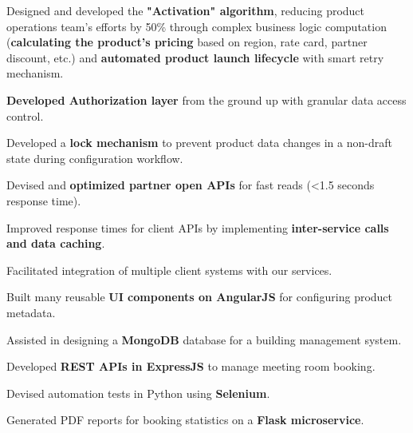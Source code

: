 \documentclass[]{resume-openfont}
\begin{document}
\begin{minipage}[t]{0.66\textwidth}
\begin{tightemize}
\item Designed and developed the \textbf{"Activation" algorithm}, reducing product operations team's efforts by 50\% through complex business logic computation (\textbf{calculating the product’s pricing} based on region, rate card, partner discount, etc.) and \textbf{automated product launch lifecycle} with smart retry mechanism.
\item \textbf{Developed Authorization layer} from the ground up with granular data access control.
\item Developed a \textbf{lock mechanism} to prevent product data changes in a non-draft state during configuration workflow.
\item Devised and \textbf{optimized partner open APIs} for fast reads (<1.5 seconds response time).
\item Improved response times for client APIs by implementing \textbf{inter-service calls and data caching}.
\item Facilitated integration of multiple client systems with our services.
\item Built many reusable \textbf{UI components on AngularJS} for configuring product metadata.
\end{tightemize}
\sectionsep

\begin{tightemize}
\item Assisted in designing a \textbf{MongoDB} database  for a building management system.
\item Developed \textbf{REST APIs in ExpressJS} to manage meeting room booking.
\item Devised automation tests in Python using \textbf{Selenium}.
\item  Generated PDF reports for booking statistics on a \textbf{Flask microservice}.
\end{tightemize}
\sectionsep




\end{minipage}
\end{document}
